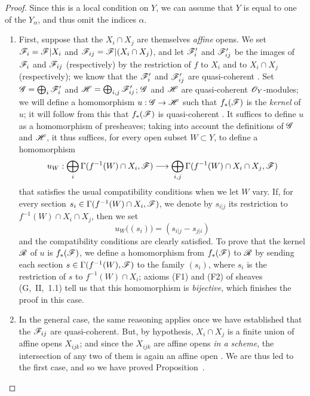 \begin{proof}
\label{proof-1.9.2.1}
Since this is a local condition on $Y$, we can assume that $Y$ is equal to one
of the $Y_\alpha$, and thus omit the indices $\alpha$.
\begin{enumerate}[label=(\alph*)]
  \item First, suppose that the $X_i\cap X_j$
    are themselves \emph{affine} opens. We set $\mathscr{F}_i=\mathscr{F}|X_i$ and
    $\mathscr{F}_{ij}=\mathscr{F}|(X_i\cap X_j)$, and let $\mathscr{F}'_i$ and
    $\mathscr{F}'_{ij}$ be the images of $\mathscr{F}_i$ and $\mathscr{F}_{ij}$
    (respectively) by the restriction of $f$ to $X_i$ and to $X_i\cap X_j$
    (respectively); we know that the $\mathscr{F}'_i$ and $\mathscr{F}'_{ij}$ are
    quasi-coherent . Set $\mathscr{G}=\bigoplus_i\mathscr{F}'_i$ and
    $\mathscr{H}=\bigoplus_{i,j}\mathscr{F}'_{ij}$; $\mathscr{G}$ and $\mathscr{H}$ are
    quasi-coherent $\mathscr{O}_Y$-modules; we will define a homomorphism
    $u:\sh{G}\to\sh{H}$ such that $f_*(\mathscr{F})$ is the
    \emph{kernel} of $u$; it will follow from this that $f_*(\mathscr{F})$ is
    quasi-coherent . It suffices to define $u$ as
    a homomorphism of presheaves; taking into account the definitions of $\mathscr{G}$
    and $\mathscr{H}$, it thus suffices, for every open subset $W\subset Y$, to define a
    homomorphism
    \[
      u_W:\bigoplus_i\Gamma(f^{-1}(W)\cap X_i,\sh{F})\to\bigoplus_{i,j}\Gamma(f^{-1}(W)\cap X_i\cap X_j,\sh{F})
    \]
    that satisfies the usual compatibility conditions when we let $W$ vary.
    If, for every section $s_i\in\Gamma(f^{-1}(W)\cap X_i,\mathscr{F})$, we denote by $s_{i|j}$ its restriction to $f^{-1}(W)\cap X_i\cap X_j$, then we set
    \[
      u_W\big((s_i)\big)=(s_{i|j}-s_{j|i})
    \]
    and the compatibility conditions are clearly satisfied.
    To prove that the kernel $\mathscr{R}$ of $u$ is $f_*(\mathscr{F})$, we define a homomorphism from $f_*(\mathscr{F})$ to $\mathscr{R}$ by sending each section $s\in\Gamma(f^{-1}(W),\mathscr{F})$ to the family $(s_i)$, where $s_i$ is the restriction of $s$ to $f^{-1}(W)\cap X_i$; axioms (F1) and (F2) of sheaves (G,~II,~1.1) tell us that this homomorphism is \emph{bijective}, which finishes the proof in this case.
  \item In the general case, the same reasoning applies once we have established that the $\mathscr{F}_{ij}$ are quasi-coherent.
    But, by hypothesis, $X_i\cap X_j$ is a finite union of affine opens $X_{ijk}$; and since the $X_{ijk}$ are affine opens \emph{in a scheme}, the intersection of any two of them is again an affine open . We are thus led to the first case, and so we have proved Proposition~.
\end{enumerate}
\end{proof}

